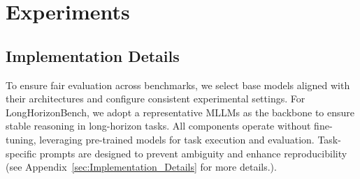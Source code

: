 \documentclass{article} %
\begin{document}
\section{Experiments}

\subsection{Implementation Details}
\label{sec:Details}

To ensure fair evaluation across benchmarks, we select base models aligned with their architectures and configure consistent experimental settings. For LongHorizonBench, we adopt a representative MLLMs \citep{comanici2025gemini} as the backbone to ensure stable reasoning in long-horizon tasks. All components operate without fine-tuning, leveraging pre-trained models for task execution and evaluation. Task-specific prompts are designed to prevent ambiguity and enhance reproducibility (see Appendix~\ref{sec:Implementation_Details} for more details.).
\end{document}
